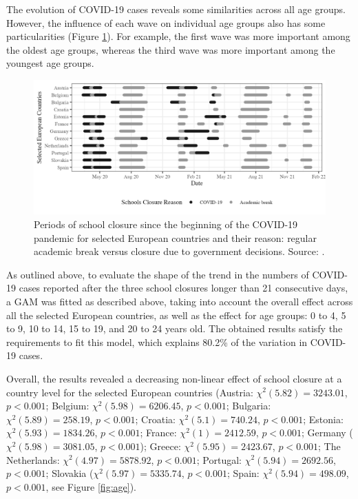 \documentclass[]{interact}
\theoremstyle{plain}%
\theoremstyle{definition}
\theoremstyle{remark}
\begin{document}
The evolution of COVID-19 cases reveals some similarities across all age groups. However, the influence of each wave on individual age groups also has some particularities (Figure \ref{fig:descriptive}). For example, the first wave was more important among the oldest age groups, whereas the third wave was more important among the youngest age groups.

\begin{figure}
\includegraphics[width=\textwidth]{manuscript_blind_files/figure-latex/descriptive-1} \caption{Periods of school closure since the beginning of the COVID-19 pandemic for selected European countries and their reason: regular academic break versus closure due to government decisions. Source: \citet{unesco2022https}.}\label{fig:descriptive}
\end{figure}

As outlined above, to evaluate the shape of the trend in the numbers of COVID-19 cases reported after the three school closures longer than 21 consecutive days, a GAM was fitted as described above, taking into account the overall effect across all the selected European countries, as well as the effect for age groups: 0 to 4, 5 to 9, 10 to 14, 15 to 19, and 20 to 24 years old. The obtained results satisfy the requirements to fit this model, which explains 80.2\% of the variation in COVID-19 cases.

Overall, the results revealed a decreasing non-linear effect of school closure at a country level for the selected European countries (Austria: \(\chi^2(5.82) = 3243.01\), \(p < 0.001\); Belgium: \(\chi^2(5.98) = 6206.45\), \(p < 0.001\); Bulgaria: \(\chi^2(5.89) = 258.19\), \(p < 0.001\); Croatia: \(\chi^2(5.1) = 740.24\), \(p < 0.001\); Estonia: \(\chi^2(5.93) = 1834.26\), \(p < 0.001\); France: \(\chi^2(1) = 2412.59\), \(p < 0.001\); Germany (\(\chi^2(5.98) = 3081.05\), \(p < 0.001\)); Greece: \(\chi^2(5.95) = 2423.67\), \(p < 0.001\); The Netherlands: \(\chi^2(4.97) = 5878.92\), \(p < 0.001\); Portugal: \(\chi^2(5.94) = 2692.56\), \(p < 0.001\); Slovakia (\(\chi^2(5.97) = 5335.74\), \(p < 0.001\); Spain: \(\chi^2(5.94) = 498.09\), \(p < 0.001\), see Figure \ref{fig:age}).
\end{document}
